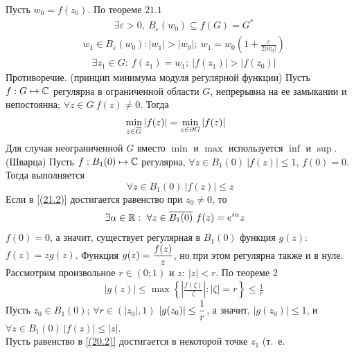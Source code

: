 Пусть $w_0 = f(z_0)$. По теореме $21.1$
\begin{align*}
  & \exists \varepsilon > 0, \ B_\varepsilon(w_0) \subseteq f(G) = G^*
\end{align*}
\begin{align*}
  & w_1 \in B_\varepsilon(w_0): \left| w_1 \right| > \left| w_0 \right|; \ w_1 = w_0\left( 1+\frac{\varepsilon}{2\left| w_0 \right|} \right)
\end{align*}
\begin{align*}
  & \exists z_1 \in G: \ f(z_1) = w_1; \ \left| f(z_1) \right| > \left| f(z_0) \right|
\end{align*}
Противоречие.
\corollary (принцип минимума модуля регулярной функции)
Пусть $f: G \mapsto \mathbb{C}$ регулярна в ограниченной области $G$, непрерывна на ее
замыкании и непостоянна; $\forall z \in G \ f(z) \neq 0$. Тогда
\begin{align*}
  & \min_{z \in \overline{G}} \left| f(z) \right| = \min_{z \in \partial G} \left| f(z) \right|
\end{align*}
\Note
Для случая неограниченной $G$ вместо $\min$ и $\max$ используется $\inf$ и
$\sup$.
\lemma (Шварца)
Пусть $f: B_1(0) \mapsto \mathbb{C}$ регулярна, $\forall z \in B_1(0) \ \left| f(z)
\right| \leq 1$, $f(0) = 0$. Тогда выполняется
\begin{equation}\label{(21.2)}
    \forall z \in B_1(0) \ \left| f(z) \right| \leq z
\end{equation}
Если в \eqref{(21.2)} достигается равенство при $z_0 \neq 0$, то
\begin{align*}
  & \exists \alpha \in \mathbb{R}: \ \forall z \in \overline{B_1(0)} \ f(z) = e^{i\alpha}z
\end{align*}
\pr
$f(0) = 0$, а значит, существует регулярная в $B_1(0)$ функция $g(z)$: $f(z) =
zg(z)$. Функция $g(z) = \displaystyle \frac{f(z)}{z}$, но при этом регулярна также и в
нуле.
\\
Рассмотрим произвольное $r \in (0;1)$ и $z: \ \left| z \right|<r$. По теореме
$2$
\begin{align*}
  & \left| g(z) \right| \leq \max \left\{ \left| \frac{f(\zeta)}{\zeta} \right| : \left| \zeta \right| =r \right\} \leq \frac{1}{r}
\end{align*}
Пусть $z_0 \in B_1(0)$; $\forall r \in (\left| z_0 \right|, 1)$ $\left| g(z_0)
\right| \leq \displaystyle \frac{1}{r}$, а значит, $\left| g(z_0) \right|\leq 1$, и
$\forall z \in B_1(0) \ \left| f(z) \right|\leq \left| z \right|$.
\\
Пусть равенство в \eqref{(20.2)} достигается в некоторой точке $z_1$ (т.~е.
